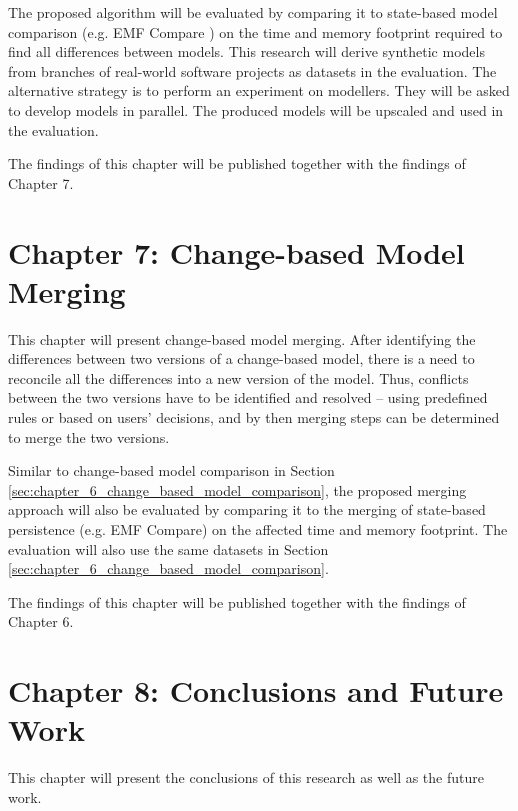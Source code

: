 \documentclass[12pt, a4paper]{report} \usepackage[titletoc]{appendix}
\begin{document}
The proposed algorithm will be evaluated by comparing it to state-based model comparison (e.g. EMF Compare \cite{eclipse2017compare}) on the time and memory footprint required to find all differences between models. This research will derive synthetic models from branches of real-world software projects as datasets in the evaluation. The alternative strategy is to perform an experiment on modellers. They will be asked to develop models in parallel. The produced models will be upscaled and used in the evaluation. 

The findings of this chapter will be published together with the findings of Chapter 7.


\section{Chapter 7: Change-based Model Merging}
\label{sec:chapter_7_change_based_model_Merging}
This chapter will present change-based model merging. After identifying the differences between two versions of a change-based model, there is a need to reconcile all the differences into a new version of the model. Thus, conflicts between the two versions have to be identified and resolved -- using predefined rules or based on users' decisions, and by then merging steps can be determined to merge the two versions. 

Similar to change-based model comparison in Section \ref{sec:chapter_6_change_based_model_comparison}, the proposed merging approach will also be evaluated by comparing it to the merging of state-based persistence (e.g. EMF Compare) on the affected time and memory footprint. The evaluation will also use the same datasets in Section \ref{sec:chapter_6_change_based_model_comparison}.

The findings of this chapter will be published together with the findings of Chapter 6.

\section{Chapter 8: Conclusions and Future Work}
\label{sec:chapter_8_conclusions}
This chapter will present the conclusions of this research as well as the future work. 

\end{document}
